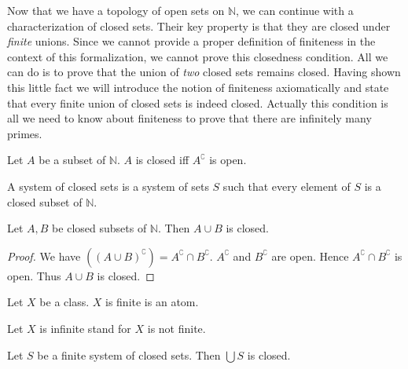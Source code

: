 \documentclass{article}
\begin{document}
  Now that we have a topology of open sets on $\mathbb{N}$, we can continue
  with a characterization of closed sets.
  Their key property is that they are closed under \textit{finite} unions.
  Since we cannot provide a proper definition of finiteness in the context of
  this formalization, we cannot prove this closedness condition.
  All we can do is to prove that the union of \textit{two} closed sets remains
  closed.
  Having shown this little fact we will introduce the notion of finiteness
  axiomatically and state that every finite union of closed sets is indeed
  closed.
  Actually this condition is all we need to know about finiteness to prove that
  there are infinitely many primes.

  \begin{forthel}
    \begin{definition}
      Let $A$ be a subset of $\mathbb{N}$.
      $A$ is closed iff $A^{\complement}$ is open.
    \end{definition}

    \begin{definition}
      A system of closed sets is a system of sets $S$ such that every element of
      $S$ is a closed subset of $\mathbb{N}$.
    \end{definition}

    \begin{lemma}
      Let $A,B$ be closed subsets of $\mathbb{N}$.
      Then $A \cup B$ is closed.
    \end{lemma}
    \begin{proof}
      We have $((A \cup B)^{\complement}) = A^{\complement} \cap B^{\complement}$.
      $A^{\complement}$ and $B^{\complement}$ are open.
      Hence $A^{\complement} \cap B^{\complement}$ is open.
      Thus $A \cup B$ is closed.
    \end{proof}

    \begin{signature}
      Let $X$ be a class.
      $X$ is finite is an atom.
    \end{signature}

    Let $X$ is infinite stand for $X$ is not finite.

    \begin{axiom}
      Let $S$ be a finite system of closed sets.
      Then $\bigcup S$ is closed.
    \end{axiom}
  \end{forthel}
\end{document}
